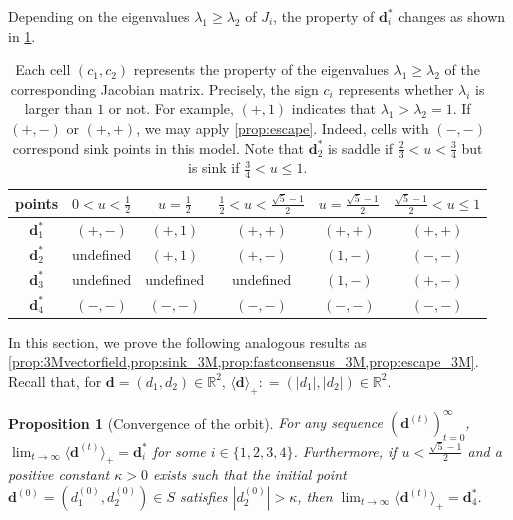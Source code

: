 \documentclass[letterpaper,11pt]{article}
\newtheorem{proposition}[theorem]{Proposition}
\newcommand*{\absp}[1]{\langle #1 \rangle_+}
\def\defeq{\mathrel{\mathop:}=}%
\begin{document}
Depending on the eigenvalues $\lambda_1\geq\lambda_2$ of $J_i$, the property of $\mathbf{d}^*_i$ changes as shown in \cref{tbl:eigentable_2C}.
\begin{table}[htbp]
\caption{
Each cell $(c_1,c_2)$ represents the property of the eigenvalues $\lambda_1\geq\lambda_2$ of the corresponding Jacobian matrix.
Precisely, the sign $c_i$ represents whether $\lambda_i$ is larger than $1$ or not.
For example, $(+,1)$ indicates that $\lambda_1>\lambda_2=1$.
If $(+,-)$ or $(+,+)$, we may apply \cref{prop:escape}.
Indeed, cells with $(-,-)$ correspond sink points in this model.
Note that $\mathbf{d}^*_2$ is saddle if $\frac{2}{3}<u<\frac{3}{4}$ but is sink if $\frac{3}{4}<u\leq 1$.
\label{tbl:eigentable_2C}}
\vspace{1em}
\centering
\begin{tabular}{|c|c|c|c|c|c|}
\hline
points           & $0<u<\frac{1}{2}$ & $u=\frac{1}{2}$ & $\frac{1}{2}<u<\frac{\sqrt{5}-1}{2}$ & $u=\frac{\sqrt{5}-1}{2}$ & $\frac{\sqrt{5}-1}{2}<u\leq 1$ \\ \hline
$\mathbf{d}^*_1$ & $(+,-)$           & $(+,1)$         & $(+,+)$                     & $(+,+)$         & $(+,+)$               \\ \hline
$\mathbf{d}^*_2$ &  undefined  & $(+,1)$         & $(+,-)$                     & $(1,-)$         & $(-,-)$               \\ \hline
$\mathbf{d}^*_3$ &  undefined       &  undefined      &    undefined               & $(1,-)$         & $(+,-)$               \\ \hline
$\mathbf{d}^*_4$ & $(-,-)$           & $(-,-)$         & $(-,-)$                     & $(-,-)$         & $(-,-)$               \\ \hline
\end{tabular}
\end{table}
%
In this section, we prove the following analogous results as \cref{prop:3Mvectorfield,prop:sink_3M,prop:fastconsensus_3M,prop:escape_3M}.
Recall that, for $\mathbf{d}=(d_1,d_2)\in\mathbb{R}^2$, $\absp{\mathbf{d}}\defeq (|d_1|,|d_2|)\in\mathbb{R}^2$.
%
\begin{proposition}[Convergence of the orbit]\label{prop:2Cvectorfield}
For any sequence $(\mathbf{d}^{(t)})_{t=0}^\infty$, $\lim_{t\to\infty} \absp{\mathbf{d}^{(t)}}=\mathbf{d}^*_i$ for some $i\in\{1,2,3,4\}$.
Furthermore, if $u<\frac{\sqrt{5}-1}{2}$ and a positive constant $\kappa>0$ exists such that the initial point $\mathbf{d}^{(0)}=(d^{(0)}_1,d^{(0)}_2)\in S$ satisfies $|d^{(0)}_2|>\kappa$, then $\lim_{t\to\infty}\absp{\mathbf{d}^{(t)}}=\mathbf{d}^*_4$.
\end{proposition}
\end{document}
